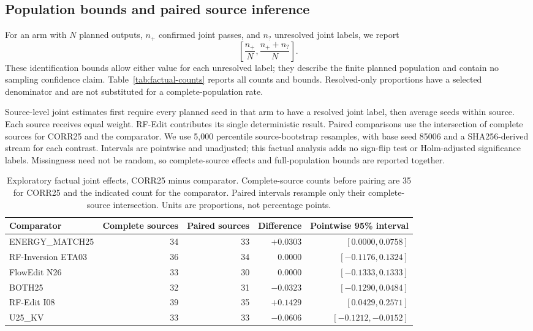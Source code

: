 \subsection{Population bounds and paired source inference}
For an arm with $N$ planned outputs, $n_+$ confirmed joint passes, and $n_?$ unresolved joint labels, we report
\begin{equation}
\left[\frac{n_+}{N},\frac{n_++n_?}{N}\right].
\label{eq:factual-bounds}
\end{equation}
These identification bounds allow either value for each unresolved label; they describe the finite planned population and contain no sampling confidence claim. Table~\ref{tab:factual-counts} reports all counts and bounds. Resolved-only proportions have a selected denominator and are not substituted for a complete-population rate.

Source-level joint estimates first require every planned seed in that arm to have a resolved joint label, then average seeds within source. Each source receives equal weight. RF-Edit contributes its single deterministic result. Paired comparisons use the intersection of complete sources for CORR25 and the comparator. We use 5,000 percentile source-bootstrap resamples, with base seed 85006 and a SHA256-derived stream for each contrast. Intervals are pointwise and unadjusted; this factual analysis adds no sign-flip test or Holm-adjusted significance labels. Missingness need not be random, so complete-source effects and full-population bounds are reported together.

\begin{table}[t]
\centering\small
\caption{Exploratory factual joint effects, CORR25 minus comparator. Complete-source counts before pairing are 35 for CORR25 and the indicated count for the comparator. Paired intervals resample only their complete-source intersection. Units are proportions, not percentage points.}
\label{tab:factual-paired}
\begin{tabular}{lrrrr}
\toprule
Comparator & Complete sources & Paired sources & Difference & Pointwise 95\% interval\\
\midrule
ENERGY\_MATCH25 & 34 & 33 & $+0.0303$ & $[0.0000,0.0758]$\\
RF-Inversion ETA03 & 36 & 34 & $0.0000$ & $[-0.1176,0.1324]$\\
FlowEdit N26 & 33 & 30 & $0.0000$ & $[-0.1333,0.1333]$\\
BOTH25 & 32 & 31 & $-0.0323$ & $[-0.1290,0.0484]$\\
RF-Edit I08 & 39 & 35 & $+0.1429$ & $[0.0429,0.2571]$\\
U25\_KV & 33 & 33 & $-0.0606$ & $[-0.1212,-0.0152]$\\
\bottomrule
\end{tabular}
\end{table}

